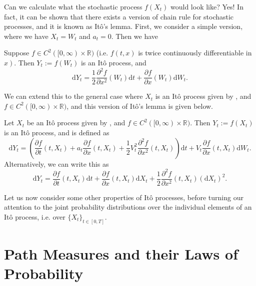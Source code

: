 Can we calculate what the stochastic process $f\left(X_t\right)$ would look like? Yes! In fact, it can be shown that there exists a version of chain rule for stochastic processes, and it is known as Itô's lemma. First, we consider a simple version, where we have $X_t=W_t$ and $a_t=0$. Then we have

\begin{definition}
    Suppose $f \in C^2([0, \infty) \times \mathbb{R})$ (i.e. $f(t, x)$ is twice continuously differentiable in $\left.x\right)$. Then $Y_t:=f\left(W_t\right)$ is an Itô process, and\label{ntn:continuous_domain}
    \[
        \mathrm{d} Y_t=\frac{1}{2} \frac{\partial^2 f}{\partial x^2}\left(W_t\right) \mathrm{d} t+\frac{\partial f}{\partial x}\left(W_t\right) \mathrm{d} W_t.
    \]
\end{definition}

We can extend this to the general case where $X_t$ is an Itô process given by , and $f \in C^2([0, \infty) \times \mathbb{R})$, and this version of Itô's lemma is given below.

\begin{theorem}
    Let $X_t$ be an Itô process given by , and $f \in C^2([0, \infty) \times \mathbb{R})$. Then $Y_t:=f\left(X_t\right)$ is an Itô process, and is defined as
    \[
    \mathrm{d} Y_t=\left(\frac{\partial f}{\partial t}\left(t, X_t\right)+a_t \frac{\partial f}{\partial x}\left(t, X_t\right)+\frac{1}{2} V_t^2 \frac{\partial^2 f}{\partial x^2}\left(t, X_t\right)\right) \mathrm{d} t+V_t \frac{\partial f}{\partial x}\left(t, X_t\right) \mathrm{d} W_t .
    \]
    Alternatively, we can write this as
    \[
        \mathrm{d} Y_t=\frac{\partial f}{\partial t}\left(t, X_t\right) \mathrm{d} t+\frac{\partial f}{\partial x}\left(t, X_t\right) \mathrm{d} X_t+\frac{1}{2} \frac{\partial^2 f}{\partial x^2}\left(t, X_t\right)\left(\mathrm{d} X_t\right)^2.
    \]
\end{theorem}

Let us now consider some other properties of Itô processes, before turning our attention to the joint probability distributions over the individual elements of an Itô process, i.e. over $\{X_t\}_{t \in [0, T]}$.

\section{Path Measures and their Laws of Probability}

